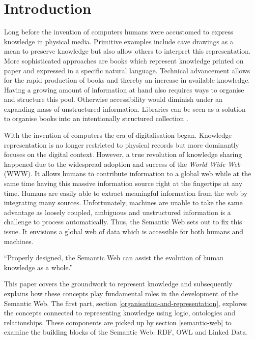 \section{Introduction}
Long before the invention of computers humans were accustomed to express knowledge in physical media.
Primitive examples include cave drawings as a mean to preserve knowledge but also allow others to interpret this representation.
More sophisticated approaches are books which represent knowledge printed on paper and expressed in a specific natural language.
Technical advancement allows for the rapid production of books and thereby an increase in available knowledge.
Having a growing amount of information at hand also requires ways to organise and structure this pool.
Otherwise accessibility would diminish under an expanding mass of unstructured information.
Libraries can be seen as a solution to organise books into an intentionally structured collection \cite{Glushko2013a}.

With the invention of computers the era of digitalisation began.
Knowledge representation is no longer restricted to physical records but more dominantly focuses on the digital context.
However, a true revolution of knowledge sharing happened due to the widespread adoption and success of the \textit{World Wide Web} (WWW).
It allows humans to contribute information to a global web while at the same time having this massive information source right at the fingertips at any time.
Humans are easily able to extract meaningful information from the web by integrating many sources.
Unfortunately, machines are unable to take the same advantage as loosely coupled, ambiguous and unstructured information is a challenge to process automatically.
Thus, the Semantic Web sets out to fix this issue.
It envisions a global web of data which is accessible for both humans and machines.

\begin{displayquote}
\enquote{Properly designed, the Semantic Web can assist the evolution of human knowledge as a whole.} \cite{Berners-lee2002b}
\end{displayquote}

This paper covers the groundwork to represent knowledge and subsequently explains how these concepts play fundamental roles in the development of  the Semantic Web.
The first part, section \ref{organisation-and-representation}, explores the concepts connected to representing knowledge using logic, ontologies and relationships.
These components are picked up by section \ref{semantic-web} to examine the building blocks of the Semantic Web: RDF, OWL and Linked Data.

